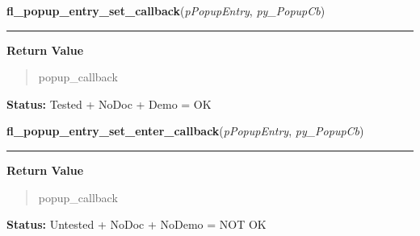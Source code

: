 \hspace{.8\funcindent}\begin{boxedminipage}{\funcwidth}

    \raggedright \textbf{fl\_popup\_entry\_set\_callback}(\textit{pPopupEntry}, \textit{py\_PopupCb})

    \vspace{-1.5ex}

    \rule{\textwidth}{0.5\fboxrule}
\setlength{\parskip}{2ex}
\setlength{\parskip}{1ex}
      \textbf{Return Value}
    \vspace{-1ex}

      \begin{quote}
      popup\_callback

      \end{quote}

\textbf{Status:} Tested + NoDoc + Demo = OK



    \end{boxedminipage}

    \label{xformslib:flpopup:fl_popup_entry_set_enter_callback}

    \vspace{0.5ex}

\hspace{.8\funcindent}\begin{boxedminipage}{\funcwidth}

    \raggedright \textbf{fl\_popup\_entry\_set\_enter\_callback}(\textit{pPopupEntry}, \textit{py\_PopupCb})

    \vspace{-1.5ex}

    \rule{\textwidth}{0.5\fboxrule}
\setlength{\parskip}{2ex}
\setlength{\parskip}{1ex}
      \textbf{Return Value}
    \vspace{-1ex}

      \begin{quote}
      popup\_callback

      \end{quote}

\textbf{Status:} Untested + NoDoc + NoDemo = NOT OK



    \end{boxedminipage}

    \label{xformslib:flpopup:fl_popup_entry_set_leave_callback}

